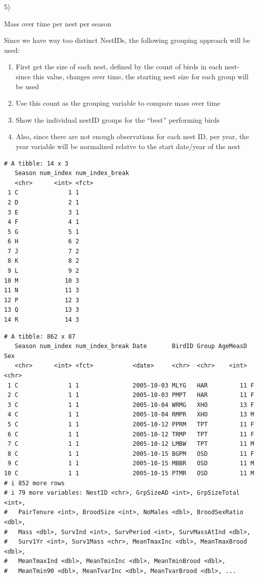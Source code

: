 \documentclass[
  letterpaper,
  DIV=11,
  numbers=noendperiod]{scrartcl}
\begin{document}
5)

Mass over time per nest per season

Since we have way too distinct NestIDs, the following grouping approach
will be used:\\

\begin{enumerate}
\def\labelenumi{\arabic{enumi}.}
\item
  First get the size of each nest, defined by the count of birds in each
  nest- since this value, changes over time, the starting nest size for
  each group will be used
\item
  Use this count as the grouping variable to compare mass over time
\item
  Show the individual nestID groups for the ``best'' performing birds
\item
  Also, since there are not enough observations for each nest ID, per
  year, the year variable will be normalized relatve to the start
  date/year of the nest
\end{enumerate}

\begin{verbatim}
# A tibble: 14 x 3
   Season num_index num_index_break
   <chr>      <int> <fct>          
 1 C              1 1              
 2 D              2 1              
 3 E              3 1              
 4 F              4 1              
 5 G              5 1              
 6 H              6 2              
 7 J              7 2              
 8 K              8 2              
 9 L              9 2              
10 M             10 3              
11 N             11 3              
12 P             12 3              
13 Q             13 3              
14 R             14 3              
\end{verbatim}

\begin{verbatim}
# A tibble: 862 x 87
   Season num_index num_index_break Date       BirdID Group AgeMeasD Sex  
   <chr>      <int> <fct>           <date>     <chr>  <chr>    <int> <chr>
 1 C              1 1               2005-10-03 MLYG   HAR         11 F    
 2 C              1 1               2005-10-03 PMPT   HAR         11 F    
 3 C              1 1               2005-10-04 WRMG   XHO         13 F    
 4 C              1 1               2005-10-04 RMPR   XHO         13 M    
 5 C              1 1               2005-10-12 PPRM   TPT         11 F    
 6 C              1 1               2005-10-12 TRMP   TPT         11 F    
 7 C              1 1               2005-10-12 LMBW   TPT         11 M    
 8 C              1 1               2005-10-15 BGPM   OSD         11 F    
 9 C              1 1               2005-10-15 MBBR   OSD         11 M    
10 C              1 1               2005-10-15 PTMR   OSD         11 M    
# i 852 more rows
# i 79 more variables: NestID <chr>, GrpSizeAD <int>, GrpSizeTotal <int>,
#   PairTenure <int>, BroodSize <int>, NoMales <dbl>, BroodSexRatio <dbl>,
#   Mass <dbl>, SurvInd <int>, SurvPeriod <int>, SurvMassAtInd <dbl>,
#   Surv1Yr <int>, Surv1Mass <chr>, MeanTmaxInc <dbl>, MeanTmaxBrood <dbl>,
#   MeanTmaxInd <dbl>, MeanTminInc <dbl>, MeanTminBrood <dbl>,
#   MeanTmin90 <dbl>, MeanTvarInc <dbl>, MeanTvarBrood <dbl>, ...
\end{verbatim}
\end{document}
